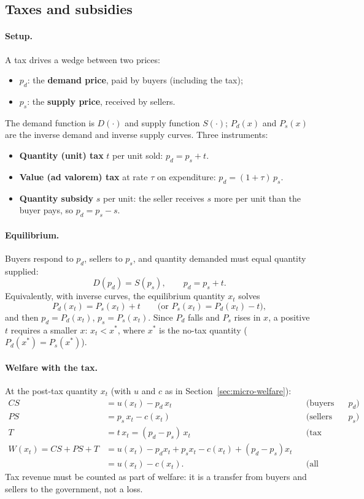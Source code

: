 \subsection{Taxes and subsidies }

\paragraph{Setup.} A tax drives a wedge between two prices:
\begin{itemize}
\item $p_d$: the \textbf{demand price}, paid by buyers (including the tax);
\item $p_s$: the \textbf{supply price}, received by sellers.
\end{itemize}
The demand function is $D(\cdot)$ and supply function $S(\cdot)$; $P_d(x)$ and $P_s(x)$ are the inverse demand and inverse supply curves. Three instruments:
\begin{itemize}
\item \textbf{Quantity (unit) tax} $t$ per unit sold: $p_d=p_s+t$.
\item \textbf{Value (ad valorem) tax} at rate $\tau$ on expenditure: $p_d=(1+\tau)\,p_s$.
\item \textbf{Quantity subsidy} $s$ per unit: the seller receives $s$ more per unit than the buyer pays, so $p_d=p_s-s$.
\end{itemize}

\paragraph{Equilibrium.} Buyers respond to $p_d$, sellers to $p_s$, and quantity demanded must equal quantity supplied:
\[
D(p_d)=S(p_s),\qquad p_d=p_s+t .
\]
Equivalently, with inverse curves, the equilibrium quantity $x_t$ solves
\[
P_d(x_t)=P_s(x_t)+t\qquad\big(\text{or } P_s(x_t)=P_d(x_t)-t\big),
\]
and then $p_d=P_d(x_t)$, $p_s=P_s(x_t)$. Since $P_d$ falls and $P_s$ rises in $x$, a positive $t$ requires a smaller $x$: $x_t<x^*$, where $x^*$ is the no-tax quantity ($P_d(x^*)=P_s(x^*)$).

\paragraph{Welfare with the tax.} At the post-tax quantity $x_t$ (with $u$ and $c$ as in Section~\ref{sec:micro-welfare}):
\begin{align*}
CS&=u(x_t)-p_d\,x_t &&\text{(buyers pay $p_d$)}\\
PS&=p_s\,x_t-c(x_t) &&\text{(sellers receive $p_s$)}\\
T&=t\,x_t=(p_d-p_s)\,x_t &&\text{(tax revenue, returned to society)}\\
W(x_t)=CS+PS+T&=u(x_t)-p_dx_t+p_sx_t-c(x_t)+(p_d-p_s)x_t\\
&=u(x_t)-c(x_t). &&\text{(all payments cancel)}
\end{align*}
Tax revenue must be counted as part of welfare: it is a transfer from buyers and sellers to the government, not a loss.


